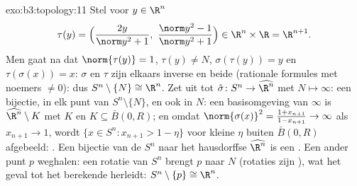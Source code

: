 \begin{solution}{exo:b3:topology:11}
Stel voor $y \in \R^n$
\[
\tau(y) = \Bigl(\frac{2y}{\norm y^2 + 1},\ \frac{\norm y^2 -
1}{\norm y^2 + 1}\Bigr) \in \R^n\times\R = \R^{n+1}.
\]
Men gaat na dat $\norm{\tau(y)} = 1$, $\tau(y) \neq N$,
$\sigma(\tau(y)) = y$ en $\tau(\sigma(x)) = x$: $\sigma$ en $\tau$
zijn elkaars inverse en beide  (rationale formules met
noemers $\neq 0$): dus $S^n\setminus\{N\} \cong \R^n$. Zet uit tot
$\hat\sigma \colon S^n \to \widehat{\R^n}$ met $N \mapsto \infty$:
een bijectie,  in elk punt van $S^n\setminus\{N\}$, en ook
in $N$: een basisomgeving van $\infty$ is $\widehat{\R^n}\setminus
K$ met $K$  en $K \subseteq \bar B(0, R)$; en omdat
$\norm{\sigma(x)}^2 = \frac{1 + x_{n+1}}{1 - x_{n+1}} \to \infty$
als $x_{n+1} \to 1$, wordt $\{x \in S^n : x_{n+1} > 1 - \eta\}$
voor kleine $\eta$ buiten $\bar B(0,R)$ afgebeeld: .
Een  bijectie van de  $S^n$ naar het hausdorffse
$\widehat{\R^n}$ is een . Een ander punt $p$
weghalen: een rotatie van $S^n$ brengt $p$ naar $N$ (rotaties zijn
), wat het geval tot het berekende herleidt: $S^n
\setminus \{p\} \cong \R^n$.
\end{solution}

